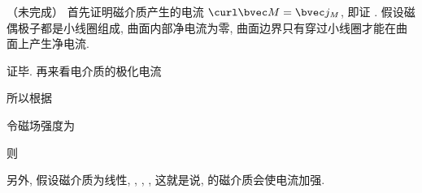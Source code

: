 
（未完成）
首先证明磁介质产生的电流 $\curl \bvec M = \bvec j_M$, 即证 . 假设磁偶极子都是小线圈组成, 曲面内部净电流为零, 曲面边界只有穿过小线圈才能在曲面上产生净电流.
 
证毕. 再来看电介质的极化电流
  
所以根据
 
令磁场强度为
 
则
 
另外, 假设磁介质为线性,
 ,  ,  ,  
这就是说,  的磁介质会使电流加强.
